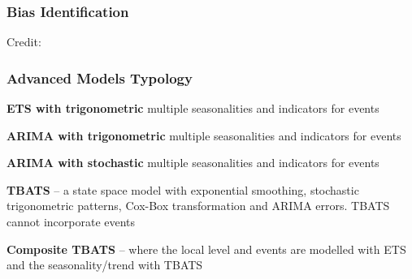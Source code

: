\documentclass{beamer}
\newenvironment{wideitemize}{\itemize\addtolength{\itemsep}{10pt}}{\enditemize}
\begin{document}
\begin{frame}
 \frametitle{Bias Identification}
 \hspace*{15pt}\hbox{\scriptsize Credit:}      
 \end{frame}


  \begin{frame}
    \frametitle{Advanced Models Typology}

  \begin{wideitemize}
    \item \textbf{ETS with trigonometric} multiple seasonalities and indicators for events
    \item \textbf{ARIMA with trigonometric} multiple seasonalities and indicators for events
    \item \textbf{ARIMA with stochastic} multiple seasonalities and indicators for events
    \item \textbf{TBATS} – a state space model with exponential smoothing, stochastic trigonometric patterns, Cox-Box transformation and ARIMA errors. TBATS cannot incorporate events 
    \item \textbf{Composite TBATS} – where the local level and events are modelled with ETS and the seasonality/trend with TBATS
    \end{wideitemize}
    
  \end{frame}
  
\end{document}

